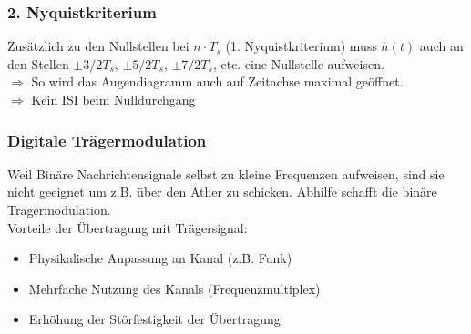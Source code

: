 \subsubsection{2. Nyquistkriterium}
	Zusätzlich zu den Nullstellen bei $n\cdot T_s$ (1. Nyquistkriterium) muss $h(t)$ auch an den Stellen $\pm 3/2 T_s$, $\pm 5/2T_s$, $\pm 7/2 T_s$, etc. eine Nullstelle aufweisen.\\
	$\Rightarrow$ So wird das Augendiagramm auch auf Zeitachse maximal geöffnet. \\
	$\Rightarrow$ Kein ISI beim Nulldurchgang

\newpage
\subsubsection{Digitale Trägermodulation }
Weil Binäre Nachrichtensignale selbst zu kleine Frequenzen aufweisen, sind sie nicht geeignet um
z.B. über den Äther zu schicken. Abhilfe schafft die binäre Trägermodulation.\\
Vorteile der Übertragung mit Trägersignal:
\begin{itemize}
	\setlength\itemsep{0.5pt}
	\item Physikalische Anpassung an Kanal (z.B. Funk)
	\item Mehrfache Nutzung des Kanals (Frequenzmultiplex)
	\item Erhöhung der Störfestigkeit der Übertragung
\end{itemize}

